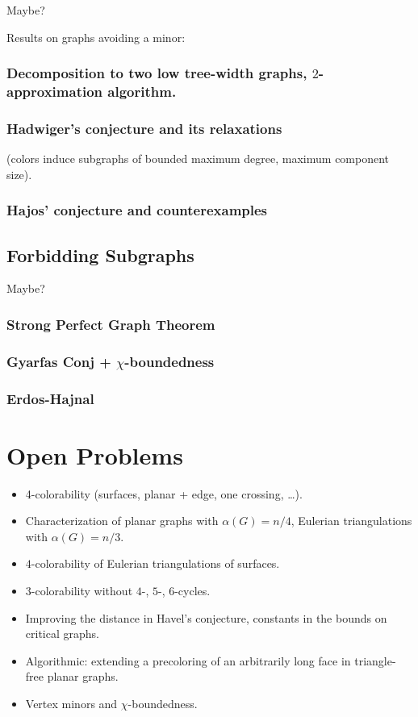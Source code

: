 \documentclass[12pt,twoside,openright,a4paper]{book}
\begin{document}
Maybe?

Results on graphs avoiding a minor:


\section{Decomposition to two low tree-width graphs, $2$-approximation algorithm.}
\section{Hadwiger's conjecture and its relaxations}
(colors induce subgraphs of bounded maximum degree, maximum component size).
\section{Hajos' conjecture and counterexamples}

\chapter{Forbidding Subgraphs}

Maybe?

\section{Strong Perfect Graph Theorem}
\section{Gyarfas Conj + $\chi$-boundedness}
\section{Erdos-Hajnal}

\part{Open Problems}

\begin{itemize}
\item 4-colorability (surfaces, planar + edge, one crossing, \ldots).
\item Characterization of planar graphs with $\alpha(G)=n/4$, Eulerian triangulations with $\alpha(G)=n/3$.
\item $4$-colorability of Eulerian triangulations of surfaces.
\item $3$-colorability without $4$-, $5$-, $6$-cycles.
\item Improving the distance in Havel's conjecture, constants in the bounds on critical graphs.
\item Algorithmic: extending a precoloring of an arbitrarily long face in triangle-free planar graphs.
\item Vertex minors and $\chi$-boundedness.
\end{itemize}

\newpage
\pagestyle{plain}
\printindex



\end{document}
